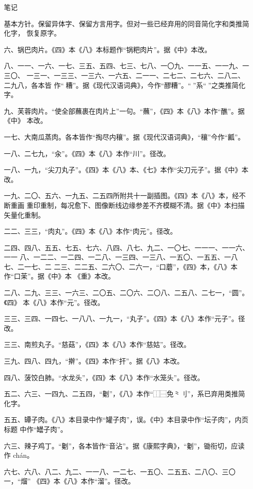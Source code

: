 笔记

基本方针。保留异体字、保留方言用字。但对一些已经弃用的同音简化字和类推简化字，
恢复原字。

六、锅巴肉片。《四》本《八》本标题作“锅粑肉片”。据《中》本改。

八、一一、一六、一七、三五、五四、七三、七八、一〇九、一一五、一一九、一三〇、
一三一、一三三、一三六、一六五、二一一、二七二、二七六、二八二、二九八，各本皆
作“𰪿糟”。据《现代汉语词典》，今作“醪糟”。“𰪿”系“𫃑”之类推简化字。

九、芙蓉肉片。“使全部蘸裹在肉片上”一句。“蘸”，《四》本《八》本作“醮”。据《中》
本改。

一七、大南瓜蒸肉。各本皆作“掏尽内穰”。据《现代汉语词典》，“穰”今作“瓤”。

一八、二七九，“汆”。《四》本《八》本作“川”。径改。

一八、一九，“尖刀丸子”。《四》本《八》本、《七》本作“尖刀元子”。据《中》本改。

一九、二〇、五六、一九五、二五四所附共十一副插图。《四》本《八》本，经不断重画
重印重制，每况愈下、图像断线边缘参差不齐模糊不清。据《中》本扫描矢量化重制。

二二、三三，“肉丸”。《四》本《八》本作“肉元”。径改。

二四、四八、五五、七五、七六、八四、八七、九二、一〇七、一一一、一一六、一一
八、一二二、一二四、一二八、一三四、一三八、一五〇、一五五、一八七、二一七、二
二三、二二五、二六〇、二六一，“口蘑”，《四》本，《八》本作“口茉”。据《中》本
《重》本改。

二八、二九、三三、一六三、二〇五、二〇六、二〇八、二五八、二七一，“圆”。《四》
本《八》本作“元”。径改。

三三、三四、一四七、一八八、一九一，“丸子”。《四》本《八》本作“元子”。径改。

三三、南煎丸子。“慈菇”，《四》本《八》本作“慈姑”。径改。

三九、四八、四九，“擀”。《四》本作“扞”。据《八》本改。

四八、菠饺白肺。“水龙头”，《四》本《八》本作“水笼头”。径改。

五二、六三、一四九、二五四，“劖”，《八》本作“⿰⿱免⺀刂”，系已弃用类推简化字。

五五、罈子肉。《八》本目录中作“罐子肉”，误。《中》本目录中作“坛子肉”，内页标题
中作“罎子肉”。

六三、辣子鸡丁。“劖”，各本皆作“音沾”。据《康熙字典》，“劖”，锄衔切，应读作
chán。

六七、六八、八二、九二、一一八、一二七、一五〇、二五五、二八〇、三〇一，“熘”
《四》本《八》本作“溜”。径改。

